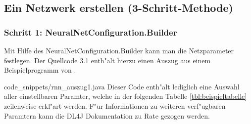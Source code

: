 {\subsection{Ein Netzwerk erstellen (3-Schritt-Methode)}

\subsubsection{Schritt 1: NeuralNetConfiguration.Builder}
Mit Hilfe des NeuralNetConfiguration.Builder kann man die Netzparameter festlegen. Der Quellcode 3.1 enth"alt hierzu einen Auszug aus einem Beispielprogramm von \cite{DL4J}.

{code_snippets/rnn_auszug1.java}
Dieser Code enth"alt lediglich eine Auswahl aller einstellbaren Paramter, welche in der folgenden Tabelle \ref{tbl:beispieltabelle} zeilenweise erkl"art werden. F"ur Informationen zu weiteren verf"ugbaren Paramtern kann die DL4J Dokumentation zu Rate gezogen werden.

}
